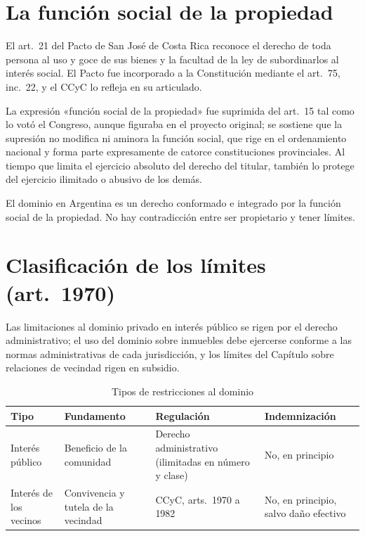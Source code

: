 \documentclass[12pt,oneside]{book}
\begin{document}
\section{La función social de la propiedad}

El art.~21 del Pacto de San José de Costa Rica reconoce el derecho de toda persona al uso y goce de sus bienes y la facultad de la ley de subordinarlos al interés social. El Pacto fue incorporado a la Constitución mediante el art.~75, inc.~22, y el CCyC lo refleja en su articulado.

La expresión «función social de la propiedad» fue suprimida del art.~15 tal como lo votó el Congreso, aunque figuraba en el proyecto original; se sostiene que la supresión no modifica ni aminora la función social, que rige en el ordenamiento nacional y forma parte expresamente de catorce constituciones provinciales. Al tiempo que limita el ejercicio absoluto del derecho del titular, también lo protege del ejercicio ilimitado o abusivo de los demás.

\begin{importante}
El dominio en Argentina es un derecho conformado e integrado por la función social de la propiedad. No hay contradicción entre ser propietario y tener límites.
\end{importante}

\section{Clasificación de los límites (art.~1970)}

Las limitaciones al dominio privado en interés público se rigen por el derecho administrativo; el uso del dominio sobre inmuebles debe ejercerse conforme a las normas administrativas de cada jurisdicción, y los límites del Capítulo sobre relaciones de vecindad rigen en subsidio.

\begin{table}[H]
\centering
\small
\begin{tabularx}{\textwidth}{>{\raggedright\arraybackslash}p{}>{\raggedright\arraybackslash}p{}>{\raggedright\arraybackslash}X>{\raggedright\arraybackslash}p{}}
\toprule
\textbf{Tipo} & \textbf{Fundamento} & \textbf{Regulación} & \textbf{Indemnización} \\
\midrule
Interés público & Beneficio de la comunidad & Derecho administrativo (ilimitadas en número y clase) & No, en principio \\
Interés de los vecinos & Convivencia y tutela de la vecindad & CCyC, arts.~1970 a 1982 & No, en principio, salvo daño efectivo \\
\bottomrule
\end{tabularx}
\caption{Tipos de restricciones al dominio}
\end{table}
\end{document}
